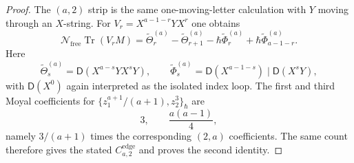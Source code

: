 \begin{proof}
  The \((a,2)\) strip is the same one-moving-letter calculation with
  \(Y\) moving through an \(X\)-string.  For
  \(V_r=X^{a-1-r}YX^r\) one obtains
  \[
    \mathcal N_{\mathrm{free}}\operatorname{Tr}(V_rM)
    =
    \widetilde\Theta_r^{(a)}-\widetilde\Theta_{r+1}^{(a)}
    -\hbar\widetilde\Phi_r^{(a)}
    +\hbar\widetilde\Phi_{a-1-r}^{(a)}.
  \]
  Here
  \[
    \widetilde\Theta_s^{(a)}
      =\mathsf D(X^{a-s}YX^sY),
    \qquad
    \widetilde\Phi_s^{(a)}
      =\mathsf D(X^{a-1-s})\mid\mathsf D(X^sY),
  \]
  with \(\mathsf D(X^0)\) again interpreted as the isolated index loop.
  The first and third Moyal coefficients for
  \(\{z_1^{a+1}/(a+1),z_2^3\}_\hbar\) are
  \[
    3,\qquad \frac{a(a-1)}4,
  \]
  namely \(3/(a+1)\) times the corresponding \((2,a)\) coefficients.
  The same count therefore gives the stated
  \(C^{\mathrm{edge}}_{a,2}\) and proves the second identity.
\end{proof}

